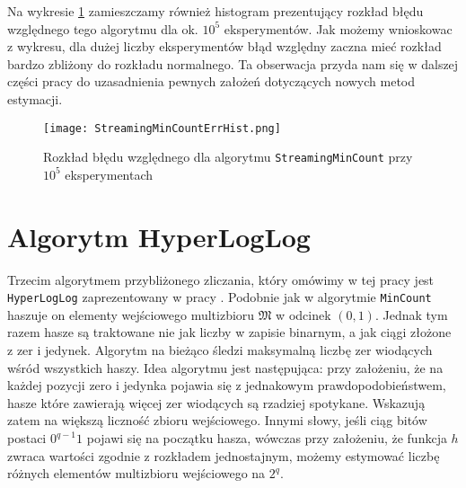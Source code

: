 Na wykresie \ref{fig:str_mincount_hist} zamieszczamy również histogram prezentujący rozkład błędu względnego tego algorytmu dla ok. $10^5$ eksperymentów. Jak możemy wnioskowac z wykresu, dla dużej liczby eksperymentów błąd względny zaczna mieć rozkład bardzo zbliżony do rozkładu normalnego. Ta obserwacja przyda nam się w dalszej części pracy do uzasadnienia pewnych założeń dotyczących nowych metod estymacji.

\begin{figure}[h!]
	\texttt{[image: StreamingMinCountErrHist.png]}
	\centering
	\caption{Rozkład błędu względnego dla algorytmu \texttt{StreamingMinCount} przy $10^5$ eksperymentach}
	\label{fig:str_mincount_hist}
\end{figure}

\section{Algorytm HyperLogLog}

Trzecim algorytmem przybliżonego zliczania, który omówimy w tej pracy jest \texttt{HyperLogLog} zaprezentowany w pracy \cite{hll}. Podobnie jak w algorytmie \texttt{MinCount}  haszuje on elementy wejściowego  multizbioru $\mathfrak{M}$ w odcinek $(0,1)$. Jednak tym razem hasze są traktowane nie jak liczby w zapisie binarnym, a jak ciągi złożone z zer i jedynek. Algorytm na bieżąco śledzi maksymalną liczbę zer wiodących wśród wszystkich haszy. Idea algorytmu jest następująca: przy założeniu, że na każdej pozycji zero i jedynka pojawia się z jednakowym prawdopodobieństwem,  hasze które zawierają więcej zer wiodących są rzadziej spotykane. Wskazują zatem na większą liczność zbioru wejściowego. Innymi słowy, jeśli ciąg bitów postaci $0^{q-1}1$ pojawi się na początku hasza, wówczas przy założeniu, że funkcja $h$ zwraca wartości zgodnie z rozkładem jednostajnym, możemy estymować liczbę różnych elementów multizbioru wejściowego na $2^{q}$.

